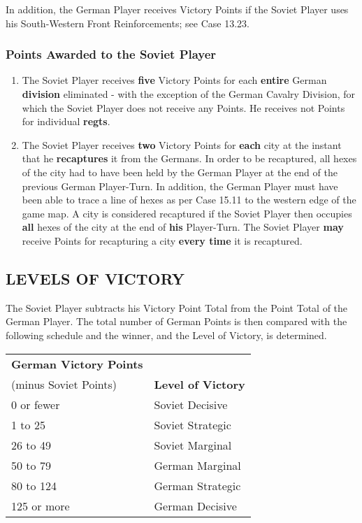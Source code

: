 In addition, the German Player receives Victory Points if the Soviet Player uses his South-Western Front Reinforcements; see Case 13.23.

\subsubsection{Points Awarded to the Soviet Player}

\begin{enumerate}
  \item The Soviet Player receives \textbf{five} Victory Points for each \textbf{entire} German \textbf{division} eliminated - with the exception of the German Cavalry Division, for which the Soviet Player does not receive any Points. He receives not Points for individual \textbf{regts}.
  \item The Soviet Player receives \textbf{two} Victory Points for \textbf{each} city at the instant that he \textbf{recaptures} it from the Germans. In order to be recaptured, all hexes of the city had to have been held by the German Player at the end of the previous German Player-Turn. In addition, the German Player must have been able to trace a line of hexes as per Case 15.11 to the western edge of the game map. A city is considered recaptured if the Soviet Player then occupies \textbf{all} hexes of the city at the end of \textbf{his} Player-Turn. The Soviet Player \textbf{may} receive Points for recapturing a city \textbf{every time} it is recaptured.
\end{enumerate}

\subsection{LEVELS OF VICTORY}

The Soviet Player subtracts his Victory Point Total from the Point Total of the German Player. The total number of German Points is then compared with the following schedule and the winner, and the Level of Victory, is determined.

\begin{tabular}{ll}
  \textbf{German Victory Points} &\\
  (minus Soviet Points) & \textbf{Level of Victory}\\
  0 or fewer & Soviet Decisive\\
  1 to 25 & Soviet Strategic\\
  26 to 49 & Soviet Marginal\\
  50 to 79 & German Marginal\\
  80 to 124 & German Strategic\\
  125 or more & German Decisive
\end{tabular}